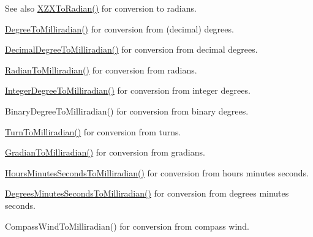 \begin{DoxySeeAlso}{See also}
\mbox{\hyperlink{group___e_g_x_math-_angle_conversions-_x_z_x_gad7d309239e80a848c661919f71fc22bd}{X\+Z\+X\+To\+Radian()}} for conversion to radians. 

\mbox{\hyperlink{group___e_g_x_math-_angle_conversions-_degree_gae4fa6c2d3805430760783650cfbfdb11}{Degree\+To\+Milliradian()}} for conversion from (decimal) degrees. 

\mbox{\hyperlink{group___e_g_x_math-_angle_conversions-_decimal_degree_gab567d02d4692d9642a4ad219e479713a}{Decimal\+Degree\+To\+Milliradian()}} for conversion from decimal degrees. 

\mbox{\hyperlink{group___e_g_x_math-_angle_conversions-_radian_gaea391f0cca39b05e298dd1cae162e7f1}{Radian\+To\+Milliradian()}} for conversion from radians. 

\mbox{\hyperlink{group___e_g_x_math-_angle_conversions-_integer_degree_ga5379a68bdff5cc4fab5bb1ba06ef9453}{Integer\+Degree\+To\+Milliradian()}} for conversion from integer degrees. 

Binary\+Degree\+To\+Milliradian() for conversion from binary degrees. 

\mbox{\hyperlink{group___e_g_x_math-_angle_conversions-_turn_ga2aea2621472294ce4c25ac7e55db51c6}{Turn\+To\+Milliradian()}} for conversion from turns. 

\mbox{\hyperlink{group___e_g_x_math-_angle_conversions-_gradian_ga144f1019dc760268a163d81fcb3ce482}{Gradian\+To\+Milliradian()}} for conversion from gradians. 

\mbox{\hyperlink{group___e_g_x_math-_angle_conversions-_hours_minutes_seconds_gad78a90abaed52ca9d5fe6b4287c4a5f3}{Hours\+Minutes\+Seconds\+To\+Milliradian()}} for conversion from hours minutes seconds. 

\mbox{\hyperlink{group___e_g_x_math-_angle_conversions-_degrees_minutes_seconds_gacadb912be6af5dac1db702db86a69eeb}{Degrees\+Minutes\+Seconds\+To\+Milliradian()}} for conversion from degrees minutes seconds. 

Compass\+Wind\+To\+Milliradian() for conversion from compass wind. 
\end{DoxySeeAlso}
\mbox{\label{group___e_g_x_math-_angle_conversions-_x_z_x_gad7d309239e80a848c661919f71fc22bd}} 
